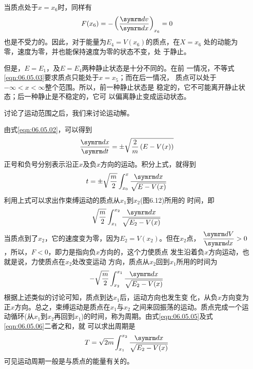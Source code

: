 当质点处于$ x = x_6 $时，同样有
\begin{equation*}
    F ( x _ { 6 } ) = - \left( \frac { \dif v } { \dif x } \right) _ { x _ 6 } = 0
\end{equation*}
也是不受力的。因此，对于能量为$  E _ { 4 } = V ( x _ { 6 } )   $的质点，在$  X = x _ { 6 }  $
处的动能为零，速度为零，并也能保持速度为零的状态不变，处
于静止。

但是，$  E = E _ { 1 }   $，及$  E = E _ 4 $两种静止状态是十分不同的。在前
一情况，不等式\eqref{eqn:06.05.03}要求质点只能处于$  x = x _ { 5 } $；而在后一情况，
质点可以处于$ - \infty < x < \infty   $整个范围。所以，前一种静止状态是
稳定的，它不可能离开静止状态；后一种静止是不稳定的，它可
以偏离静止变成运动状态。

讨论了运动范围之后，我们来讨论运动解。

由式\eqref{eqn:06.05.02}，可以得到
\begin{equation*}
    \frac { \dif x } { \dif t } = \pm \sqrt { \frac { 2 } { m } \left( E - V ( x ) \right) }
\end{equation*}
正号和负号分别表示沿正$ x $及负$ x $方向的运动。积分上式，就得到
\begin{equation}\label{eqn:06.05.04}
    t = \pm \sqrt { \frac { m } { 2 } } \int _ { x _ { 0 } } ^ { x } \frac { \dif x } { \sqrt { E - V ( x ) } }
\end{equation}
利用上式可以求出作束缚运动的质点从$ x_1 $到$ x_2 $(图6.12)所用的
时间，即
\begin{equation}\label{eqn:06.05.05}
    \sqrt { \frac { m } { 2 } } \int _ { x _ { 1 } } ^ { x _ { 2 } } \frac { \dif x } { \sqrt { E _ { 2 } - V ( x ) } }
\end{equation}
当质点到了$ x_2 $，它的速度变为零，因为$  E _ { 2 } = V ( x _ { 2 } )   $。但在$ x_2 $点，
$ \dfrac { \dif V } { \dif x } > 0   $
，所以，$  F < 0  $，即力是指向负$ x $方向的，这个力使质点
发生沿着负$ x $方向运动，也就是说，力使质点在$ x_2 $处改变运动
方向，质点从$ x_2 $回到$ x_1 $所用的时间为
\begin{equation}\label{eqn:06.05.06}
    - \sqrt { \frac { m } { 2 } } \int _ { x _ { 2 } } ^ { x _ { 1 } }  \frac { \dif x } { \sqrt { E _ { 2 } - V ( x ) } }
\end{equation}
根据上述类似的讨论可知，质点到达$ x_1 $后，运动方向也发生变
化，从负$ x $方向变为正$ x $方向。总之，束缚运动是质点在$ x_1 $与$ x_2 $
之间来回振荡的运动。质点完成一个运动循环(从$ x_1 $到$ x_2 $再回到$
x _ { 1 } $)的时间，称为周期。由式\eqref{eqn:06.05.05}及式\eqref{eqn:06.05.06}二者之和，就
可以求出周期是
\begin{equation}\label{eqn:06.05.07}
    T = \sqrt { 2 m } \int _ { x _ { 1 } } ^ { x _ { 2 } } \frac { \dif x } { \sqrt { { E _ { 2 } - V ( x ) } } }
\end{equation}
可见运动周期一般是与质点的能量有关的。

